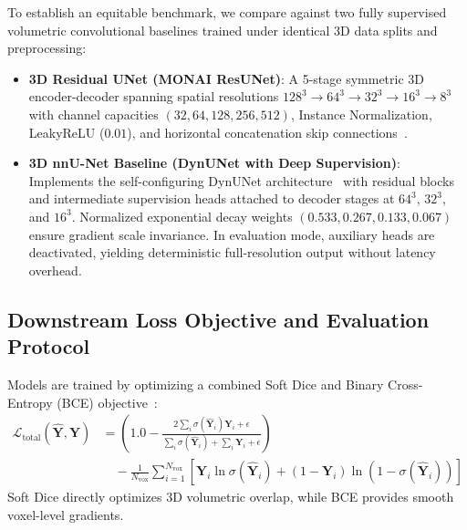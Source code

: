 \documentclass{article}
\begin{document}
To establish an equitable benchmark, we compare against two fully supervised volumetric convolutional baselines trained under identical 3D data splits and preprocessing:
\begin{itemize}
    \item \textbf{3D Residual UNet (MONAI ResUNet)}: A 5-stage symmetric 3D encoder-decoder spanning spatial resolutions $128^3 \to 64^3 \to 32^3 \to 16^3 \to 8^3$ with channel capacities $(32, 64, 128, 256, 512)$, Instance Normalization, LeakyReLU ($0.01$), and horizontal concatenation skip connections~\citep{ronneberger2015u,cciccek20163d}.
    \item \textbf{3D nnU-Net Baseline (DynUNet with Deep Supervision)}: Implements the self-configuring DynUNet architecture~\citep{isensee2021nnunet} with residual blocks and intermediate supervision heads attached to decoder stages at $64^3$, $32^3$, and $16^3$. Normalized exponential decay weights $(0.533, 0.267, 0.133, 0.067)$ ensure gradient scale invariance. In evaluation mode, auxiliary heads are deactivated, yielding deterministic full-resolution output without latency overhead.
\end{itemize}

\subsection{Downstream Loss Objective and Evaluation Protocol}
\label{sec:loss_and_metrics}

Models are trained by optimizing a combined Soft Dice and Binary Cross-Entropy (BCE) objective~\citep{milletari2016vnet}:
\begin{equation}
\begin{split}
    \mathcal{L}_{\text{total}}(\hat{\mathbf{Y}}, \mathbf{Y}) &= \left( 1.0 - \frac{2 \sum_i \sigma(\hat{\mathbf{Y}}_i) \mathbf{Y}_i + \epsilon}{\sum_i \sigma(\hat{\mathbf{Y}}_i) + \sum_i \mathbf{Y}_i + \epsilon} \right) \\
    &\quad - \frac{1}{N_{\text{vox}}} \sum_{i=1}^{N_{\text{vox}}} \left[ \mathbf{Y}_i \ln \sigma(\hat{\mathbf{Y}}_i) + (1 - \mathbf{Y}_i) \ln(1 - \sigma(\hat{\mathbf{Y}}_i)) \right]
\end{split}
\end{equation}
Soft Dice directly optimizes 3D volumetric overlap, while BCE provides smooth voxel-level gradients.
\end{document}
